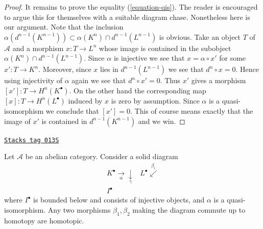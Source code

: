 \begin{proof}
\medskip\noindent
It remains to prove the equality (\ref{equation-qis}).
The reader is encouraged to argue this for themselves with a suitable
diagram chase. Nonetheless here is our argument.
Note that the inclusion
$\alpha(d^{n - 1}(K^{n - 1})) \subset \alpha(K^n) \cap d^{n - 1}(L^{n - 1})$
is obvious. Take an object $T$ of $\mathcal{A}$ and a morphism
$x : T \to L^n$ whose image is contained in the subobject
$\alpha(K^n) \cap d^{n - 1}(L^{n - 1})$.
Since $\alpha$ is injective we see that $x = \alpha \circ x'$ for
some $x' : T \to K^n$. Moreover, since $x$ lies in $d^{n - 1}(L^{n - 1})$
we see that $d^n \circ x = 0$. Hence using injectivity of $\alpha$ again
we see that $d^n \circ x' = 0$. Thus $x'$ gives a morphism
$[x'] : T \to H^n(K^\bullet)$. On the other hand the corresponding
map $[x] : T \to H^n(L^\bullet)$ induced by $x$ is zero by assumption.
Since $\alpha$ is a quasi-isomorphism we conclude that $[x'] = 0$.
This of course means exactly that the image of $x'$ is
contained in $d^{n - 1}(K^{n - 1})$ and we win.
\end{proof}

\begin{lemma}
\label{derived-lemma-morphisms-equal-up-to-homotopy}
\href{https://stacks.math.columbia.edu/tag/013S}{\texttt{Stacks tag 013S}}

Let $\mathcal{A}$ be an abelian category.
Consider a solid diagram
$$
\begin{array}{cc}K^\bullet \underset{\alpha}{\longrightarrow}\underset{\gamma}{\downarrow} & L^\bullet \overset{\beta_i}{\swarrow} \\ I^\bullet & \end{array}
$$
where $I^\bullet$ is bounded below and consists of injective
objects, and $\alpha$ is a quasi-isomorphism.
Any two morphisms $\beta_1, \beta_2$ making the diagram commute
up to homotopy are homotopic.
\end{lemma}

